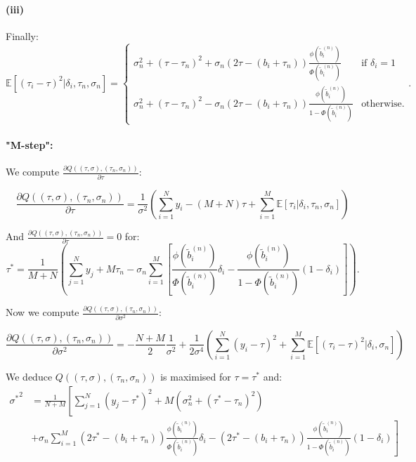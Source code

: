 \documentclass[11pt]{article}
\begin{document}
\paragraph*{(iii)}
Finally:
\[
  \mathbb{E}\left[(\tau_i - \tau)^2| \delta_i, \tau_n, \sigma_n \right]= \left\{
    \begin{array}{ll}
      \sigma_n^2 + (\tau - \tau_n)^2 + \sigma_n (2 \tau - (b_i + \tau_n)) \frac{\phi\left(\tilde{b}_i^{(n)}\right)}{\Phi\left(\tilde{b}_i^{(n)}\right)}  & \mbox{if } \delta_i = 1 \\
      \sigma_n^2 + (\tau - \tau_n)^2 - \sigma_n (2 \tau - (b_i + \tau_n)) \frac{\phi\left(\tilde{b}_i^{(n)}\right)}{1 - \Phi\left(\tilde{b}_i^{(n)}\right)} & \mbox{otherwise.}
    \end{array}
\right..
\]

\paragraph*{"M-step":}
We compute $\frac{\partial Q((\tau, \sigma), (\tau_n, \sigma_n))}{\partial \tau}$:

\[
  \frac{\partial Q((\tau, \sigma), (\tau_n, \sigma_n))}{\partial \tau} = \frac{1}{\sigma^2}\left(\sum_{i=1}^N y_i - (M+N) \tau + \sum_{i=1}^M \mathbb{E}\left[\tau_i| \delta_i, \tau_n, \sigma_n \right]\right)
\]

And $\frac{\partial Q((\tau, \sigma), (\tau_n, \sigma_n))}{\partial \tau} = 0$ for:
\[
  \tau^* = \frac{1}{M+N}\left(\sum_{j=1}^N y_j + M \tau_n -  \sigma_n \sum_{i=1}^M  \left[\frac{\phi\left(\tilde{b}_i^{(n)}\right)}{\Phi\left(\tilde{b}_i^{(n)}\right)} \delta_i - \frac{\phi\left(\tilde{b}_i^{(n)}\right)}{1 - \Phi\left(\tilde{b}_i^{(n)}\right)} (1-\delta_i)\right] \right).
\]

Now we compute $\frac{\partial Q((\tau, \sigma), (\tau_n, \sigma_n))}{\partial \sigma^2}$:

\[
  \frac{\partial Q((\tau, \sigma), (\tau_n, \sigma_n))}{\partial \sigma^2} = - \frac{N + M}{2} \frac{1}{\sigma^2} + \frac{1}{2\sigma^4} \left(\sum_{i = 1}^N (y_i - \tau)^2 + \sum_{i = 1}^M \mathbb{E}\left[(\tau_i - \tau)^2| \delta_i, \sigma_n\right]\right)
\]

We deduce $Q((\tau, \sigma), (\tau_n, \sigma_n))$ is maximised for $\tau = \tau^*$ and:
\begin{align*}
  {\sigma^*}^2 &= \frac{1}{N + M}\left[ \sum_{j=1}^N(y_j - \tau^*)^2 + M (\sigma_n^2 + (\tau^* - \tau_n)^2)\right.\\
               &\left.+ \sigma_n \sum_{i=1}^M   (2 \tau^* - (b_i + \tau_n)) \frac{\phi\left(\tilde{b}_i^{(n)}\right)}{\Phi\left(\tilde{b}_i^{(n)}\right)} \delta_i  - (2 \tau^* - (b_i + \tau_n)) \frac{\phi\left(\tilde{b}_i^{(n)}\right)}{1 - \Phi\left(\tilde{b}_i^{(n)}\right)} (1 - \delta_i)\right]
\end{align*}
\end{document}
